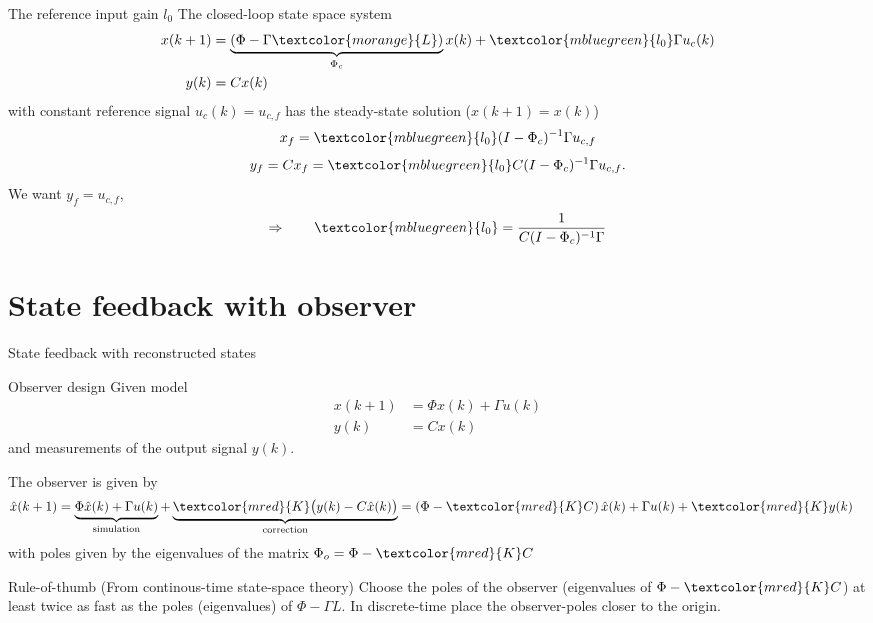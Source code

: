 \documentclass[presentation,aspectratio=1610]{beamer}
\begin{document}
\begin{frame}[label={sec:org98b4743}]{The reference input gain \(l_0\)}
The closed-loop state space system
\begin{equation*}
\begin{split}
 x(k+1) &= \underbrace{\left(\Phi -\Gamma \textcolor{morange}{L} \right)}_{\Phi_c} x(k) + \textcolor{mbluegreen}{l_0}\Gamma u_c(k)\\
 y(k) &= C x(k)
\end{split}
\end{equation*}
with constant reference signal \(u_c(k) = u_{c,f}\) has the steady-state solution (\(x(k+1)=x(k)\))
\pause
\[ x_f =  \textcolor{mbluegreen}{l_0} (I - \Phi_c)^{-1}\Gamma u_{c,f}\]
\[ y_f = Cx_f = \textcolor{mbluegreen}{l_0} C(I - \Phi_c)^{-1}\Gamma u_{c,f}.\]
We want \(y_f =  u_{c,f}\),
\[ \Rightarrow \qquad \textcolor{mbluegreen}{l_0} = \frac{1}{C(I-\Phi_c)^{-1}\Gamma}\]
\end{frame}

\section{State feedback with observer}
\label{sec:org4879af8}
\begin{frame}[label={sec:org7fa7c18}]{State feedback with reconstructed states}
\end{frame}

\begin{frame}[label={sec:orgb008220}]{Observer design}
Given model
 \begin{equation*}
 \begin{split}
  x(k+1) &= \Phi x(k) + \Gamma u(k)\\
  y(k) &= C x(k)
 \end{split}
 \label{eq:ssmodel}
\end{equation*}
and measurements of the output signal \(y(k)\). 

The observer is given by
\begin{equation*}
\begin{split}
\hat{x}(k+1) &= \underbrace{\Phi \hat{x}(k) + \Gamma u(k)}_{\text{simulation}} + \underbrace{\textcolor{mred}{K}\big(y(k) - C\hat{x}(k)\big)}_{\text{correction}} = \left(\Phi - \textcolor{mred}{K}C\right)\hat{x}(k) +  \Gamma u(k) + \textcolor{mred}{K}y(k)
\end{split}
\end{equation*}
with poles given by the eigenvalues of the matrix \(\Phi_o = \Phi - \textcolor{mred}{K}C\)

\alert{Rule-of-thumb} (From continous-time state-space theory) Choose the poles of the observer (eigenvalues of \(\Phi-\textcolor{mred}{K}C\)) at least twice as fast as the poles (eigenvalues) of \(\Phi-\Gamma L\). In discrete-time place the observer-poles closer to the origin.  
\end{frame}
\end{document}
